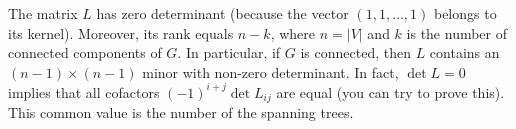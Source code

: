 

\setcounter{section}{2}
\setcounter{subsection}{5}
\setcounter{dfn}{14}


The matrix $L$ has zero determinant (because the vector $(1, 1, \ldots, 1)$ belongs to its kernel).
Moreover, its rank equals $n-k$, where $n = |V|$ and $k$ is the number of connected components of $G$.
In particular, if $G$ is connected, then $L$ contains an $(n-1) \times (n-1)$ minor with non-zero determinant.
In fact, $\det L = 0$ implies that all cofactors $(-1)^{i+j} \det L_{ij}$ are equal (you can try to prove this).
This common value is the number of the spanning trees.




